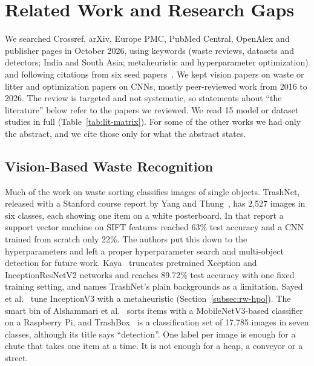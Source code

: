 \section{Related Work and Research Gaps}
\label{sec:related}

We searched Crossref, arXiv, Europe PMC, PubMed Central, OpenAlex and publisher pages in October 2026, using keywords (waste reviews, datasets and detectors; India and South Asia; metaheuristic and hyperparameter optimization) and following citations from six seed papers~\cite{majchrowska2022deep,yang2016classification,kaya2023classification,sayed2024intelligent,aguerchi2024cnn,alshammari2025smart}. We kept vision papers on waste or litter and optimization papers on CNNs, mostly peer-reviewed work from 2016 to 2026. The review is targeted and not systematic, so statements about ``the literature'' below refer to the papers we reviewed. We read 15 model or dataset studies in full (Table~\ref{tab:lit-matrix}). For some of the other works we had only the abstract, and we cite those only for what the abstract states.

\subsection{Vision-Based Waste Recognition}
\label{subsec:rw-waste}

Much of the work on waste sorting classifies images of single objects. TrashNet, released with a Stanford course report by Yang and Thung~\cite{yang2016classification}, has 2,527 images in six classes, each showing one item on a white posterboard. In that report a support vector machine on SIFT features reached 63\% test accuracy and a CNN trained from scratch only 22\%. The authors put this down to the hyperparameters and left a proper hyperparameter search and multi-object detection for future work. Kaya~\cite{kaya2023classification} truncates pretrained Xception and InceptionResNetV2 networks and reaches 89.72\% test accuracy with one fixed training setting, and names TrashNet's plain backgrounds as a limitation. Sayed et al.~\cite{sayed2024intelligent} tune InceptionV3 with a metaheuristic (Section~\ref{subsec:rw-hpo}). The smart bin of Alshammari et al.~\cite{alshammari2025smart} sorts items with a MobileNetV3-based classifier on a Raspberry Pi, and TrashBox~\cite{kumsetty2022trashbox} is a classification set of 17,785 images in seven classes, although its title says ``detection''. One label per image is enough for a chute that takes one item at a time. It is not enough for a heap, a conveyor or a street.

